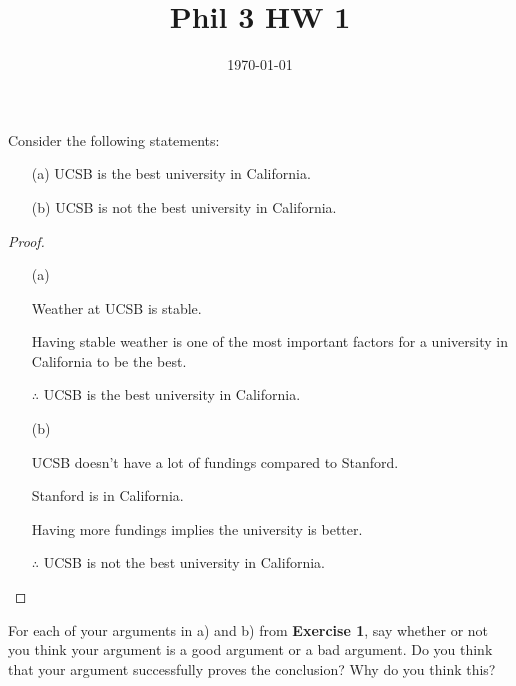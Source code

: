 \documentclass{article}
\title{Phil 3 HW 1}
\date{\today}
\begin{document}
\maketitle

\begin{ques}\label{q1}
    Consider the following statements:
    \begin{itemize}
        \item[(a)] UCSB is the best university in California.
        \item[(b)] UCSB is not the best university in California. 
    \end{itemize}
\end{ques}

\begin{proof}
    
    \hfil

    \begin{itemize}
        \item[(a)]
        
        Weather at UCSB is stable.

        Having stable weather is one of the most important factors for a university in California to be the best.

        $\therefore$ UCSB is the best university in California.

        \item[(b)]
        
        UCSB doesn't have a lot of fundings compared to Stanford.

        Stanford is in California.

        Having more fundings implies the university is better.

        $\therefore$ UCSB is not the best university in California.
    \end{itemize}
\end{proof}

\hfil

\begin{ques}
    For each of your arguments in a) and b) from \textbf{Exercise 1}, say whether or not you think your argument is a good argument or a bad argument. Do you think that your argument successfully proves the conclusion? Why do you think this?
\end{ques}\label{q2}
\end{document}
